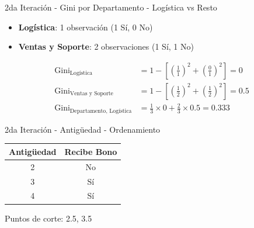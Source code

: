 \documentclass{beamer}
\begin{document}
\begin{frame}{2da Iteración - Gini por Departamento - Logística vs Resto}
    \begin{itemize}
        \item \textbf{Logística}: 1 observación (1 Sí, 0 No)
        \item \textbf{Ventas y Soporte}: 2 observaciones (1 Sí, 1 No)
    \end{itemize}
    
    \vspace{0.5em}
    
    \begin{align*}
        \mathrm{Gini}_{\text{Logística}} &= 1 - \left[\left(\tfrac{1}{1}\right)^2 + \left(\tfrac{0}{1}\right)^2\right] = 0 \\
        \mathrm{Gini}_{\text{Ventas y Soporte}} &= 1 - \left[\left(\tfrac{1}{2}\right)^2 + \left(\tfrac{1}{2}\right)^2\right] = 0.5 \\
        \mathrm{Gini}_{\text{Departamento, Logística}} &= \tfrac{1}{3}\times0 + \tfrac{2}{3}\times0.5 = 0.333
    \end{align*}
\end{frame}

\begin{frame}{2da Iteración - Antigüedad - Ordenamiento}
    \begin{center}
        \begin{tabular}{cc}
            \toprule
            Antigüedad & Recibe Bono \\
            \midrule
            2 & No \\
            3 & Sí \\
            4 & Sí \\
            \bottomrule
        \end{tabular}
    \end{center}
    
    \vspace{1em}
    
    \begin{center}
        \Large Puntos de corte: 2.5, 3.5
    \end{center}
\end{frame}
\end{document}

